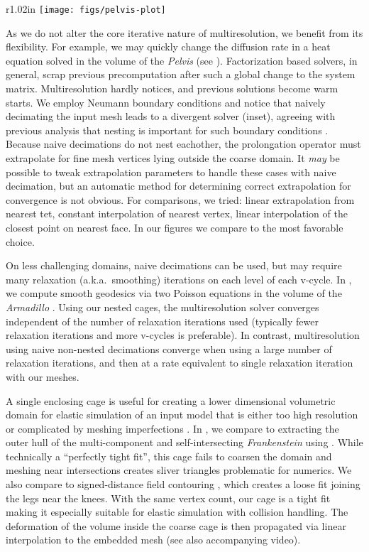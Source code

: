 \begin{wrapfigure}{r}{1.02in}
%
\centering
%
\texttt{[image: figs/pelvis-plot]}
%
\end{wrapfigure}
%
As we do not alter the core iterative nature of multiresolution, we benefit
from its flexibility. For example, we may quickly change the diffusion rate in
a heat equation solved in the volume of the \emph{Pelvis} (see
). 
%
Factorization based solvers, in general, scrap previous precomputation after
such a global change to the system matrix. 
%
Multiresolution hardly notices, and previous solutions become warm starts.
%
We employ Neumann boundary conditions and notice that naively decimating the
input mesh leads to a divergent solver (inset), agreeing with previous analysis
that nesting is important for such boundary conditions \cite{chan1999boundary}.
%
Because naive decimations do not nest eachother, the prolongation operator must
extrapolate for fine mesh vertices lying outside the coarse domain.
%
It \emph{may} be
possible to tweak extrapolation parameters to handle these cases with naive
decimation, but an automatic method for determining correct extrapolation for
convergence is not obvious.
%
For comparisons, we tried: linear extrapolation from nearest tet, constant
interpolation of nearest vertex, linear interpolation of the closest point on
nearest face. In our figures we compare to the most favorable choice.

On less challenging domains, naive decimations can be used, but may require
many relaxation (a.k.a.\ smoothing) iterations on each level of each v-cycle.
%
In , we compute smooth geodesics via two Poisson
equations in the volume of the \emph{Armadillo} \cite{Crane:2013:RFV}.
%
Using our nested cages, the multiresolution solver converges independent of the
number of relaxation iterations used (typically fewer relaxation iterations and
more v-cycles is preferable).
%
In contrast, multiresolution using naive non-nested decimations converge when
using a large number of relaxation iterations, and then at a rate equivalent to
single relaxation iteration with our meshes.

A single enclosing cage is useful for creating a lower dimensional volumetric
domain for elastic simulation of an input model that is either too high
resolution or complicated by meshing imperfections \cite{Xu:2014:SDF}.
%
In , we compare to extracting the outer hull of
the multi-component and self-intersecting \emph{Frankenstein} using
\cite{Jacobson:WN:2013}.
%
While technically a ``perfectly tight fit'', this cage fails to coarsen the
domain and meshing near intersections creates sliver triangles problematic for
numerics.
%
We also compare to signed-distance field contouring \cite{Xu:2014:SDF}, which
creates a loose fit joining the legs near the knees.
%
With the same vertex count, our cage is a tight fit making it especially
suitable for elastic simulation with collision handling.
%
The deformation of the volume inside the coarse cage is then propagated via
linear interpolation to the embedded mesh (see also accompanying video).


